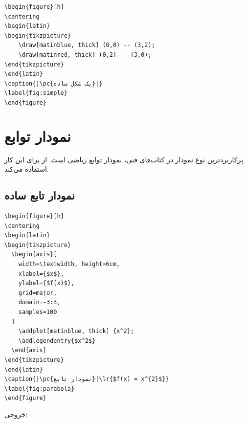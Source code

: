 \begin{latin}
\begin{verbatim}
\begin{figure}[h]
\centering
\begin{latin}
\begin{tikzpicture}
    \draw[matinblue, thick] (0,0) -- (3,2);
    \draw[matinred, thick] (0,2) -- (3,0);
\end{tikzpicture}
\end{latin}
\caption{|\pc{یک شکل ساده}|}
\label{fig:simple}
\end{figure}
\end{verbatim}
\end{latin}


\section{نمودار توابع}
\label{sec:graphics-functions}

پرکاربردترین نوع نمودار در کتاب‌های فنی،
نمودار توابع ریاضی است.  از
 برای این کار استفاده می‌کند.

\subsection{نمودار تابع ساده}
\label{sec:graphics-simple-function}

\begin{latin}
\begin{verbatim}
\begin{figure}[h]
\centering
\begin{latin}
\begin{tikzpicture}
  \begin{axis}[
    width=\textwidth, height=6cm,
    xlabel={$x$},
    ylabel={$f(x)$},
    grid=major,
    domain=-3:3,
    samples=100
  ]
    \addplot[matinblue, thick] {x^2};
    \addlegendentry{$x^2$}
  \end{axis}
\end{tikzpicture}
\end{latin}
\caption{|\pc{نمودار تابع}|\lr{$f(x) = x^{2}$}}
\label{fig:parabola}
\end{figure}
\end{verbatim}
\end{latin}

خروجی:

